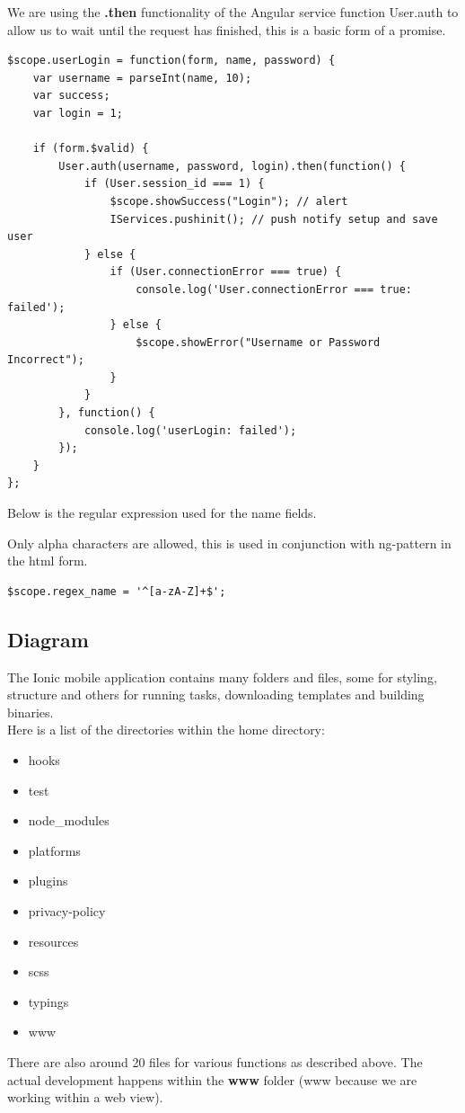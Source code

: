 We are using the \textbf{.then} functionality of the Angular service function User.auth to allow us to wait until the request has finished, this is a basic form of a promise.
\begin{verbatim}
$scope.userLogin = function(form, name, password) {
    var username = parseInt(name, 10);
    var success;
    var login = 1;
    
    if (form.$valid) {
        User.auth(username, password, login).then(function() {
            if (User.session_id === 1) {
                $scope.showSuccess("Login"); // alert
                IServices.pushinit(); // push notify setup and save user
            } else {
                if (User.connectionError === true) {
                    console.log('User.connectionError === true: failed');
                } else {
                    $scope.showError("Username or Password Incorrect");
                }
            }
        }, function() {
            console.log('userLogin: failed');
        });
    }
};
\end{verbatim}

Below is the regular expression used for the name fields.

Only alpha characters are allowed, this is used in conjunction with ng-pattern in the html form.
\begin{verbatim}
$scope.regex_name = '^[a-zA-Z]+$';
\end{verbatim}

\pagebreak
\subsection{Diagram}
The Ionic mobile application contains many folders and files, some for styling, structure and others for running tasks, downloading templates and building binaries.
\\

\noindent Here is a list of the directories within the home directory:
\begin{itemize}[noitemsep,nolistsep]
\item hooks
\item test
\item node\_modules
\item platforms
\item plugins
\item privacy-policy
\item resources
\item scss
\item typings
\item www
\end{itemize}
There are also around 20 files for various functions as described above.
The actual development happens within the \textbf{www} folder (www because we are working within a web view).
\\

